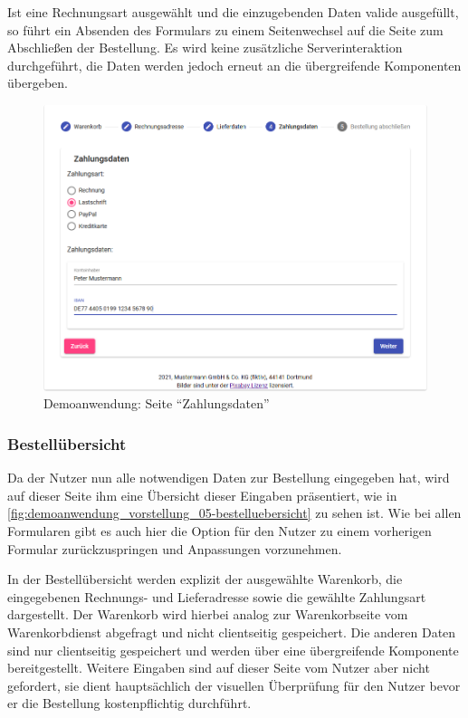 Ist eine Rechnungsart ausgewählt und die einzugebenden Daten valide ausgefüllt, so führt ein Absenden des Formulars zu einem Seitenwechsel auf die Seite zum Abschließen der Bestellung. Es wird keine zusätzliche Serverinteraktion durchgeführt, die Daten werden jedoch erneut an die übergreifende Komponenten übergeben.

\begin{figure}[H]
	\centering
	\includegraphics[width=0.90\linewidth]{img/04_erstellung-poc/demoanwendung_vorstellung_04-zahlungsdaten.png}
	\caption{Demoanwendung: Seite \enquote{Zahlungsdaten}}
	\label{fig:demoanwendung_vorstellung_04-zahlungsdaten}
\end{figure}

\subsubsection{Bestellübersicht}

Da der Nutzer nun alle notwendigen Daten zur Bestellung eingegeben hat, wird auf dieser Seite ihm eine Übersicht dieser Eingaben präsentiert, wie in \autoref{fig:demoanwendung_vorstellung_05-bestelluebersicht} zu sehen ist. Wie bei allen Formularen gibt es auch hier die Option für den Nutzer zu einem vorherigen Formular zurückzuspringen und Anpassungen vorzunehmen.

In der Bestellübersicht werden explizit der ausgewählte Warenkorb, die eingegebenen Rechnungs- und Lieferadresse sowie die gewählte Zahlungsart dargestellt. Der Warenkorb wird hierbei analog zur Warenkorbseite vom Warenkorbdienst abgefragt und nicht clientseitig gespeichert. Die anderen Daten sind nur clientseitig gespeichert und werden über eine übergreifende Komponente bereitgestellt. Weitere Eingaben sind auf dieser Seite vom Nutzer aber nicht gefordert, sie dient hauptsächlich der visuellen Überprüfung für den Nutzer bevor er die Bestellung kostenpflichtig durchführt.

